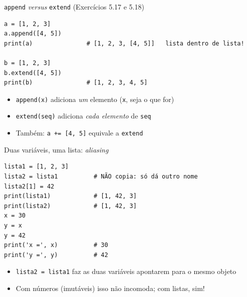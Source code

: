 \documentclass[aspectratio=169,10pt,t]{beamer}
\begin{document}
\begin{frame}[fragile]{\texttt{append} \emph{versus} \texttt{extend} (Exercícios 5.17 e 5.18)}
\begin{lstlisting}
a = [1, 2, 3]
a.append([4, 5])
print(a)               # [1, 2, 3, [4, 5]]   lista dentro de lista!

b = [1, 2, 3]
b.extend([4, 5])
print(b)               # [1, 2, 3, 4, 5]
\end{lstlisting}
  \begin{itemize}
    \item \texttt{append(x)} adiciona \emph{um} elemento (\texttt{x}, seja o que for)
    \item \texttt{extend(seq)} adiciona \emph{cada elemento} de \texttt{seq}
    \item Também: \texttt{a += [4, 5]} equivale a \texttt{extend}
  \end{itemize}
\end{frame}

\begin{frame}[fragile]{Duas variáveis, uma lista: \emph{aliasing}}
\begin{lstlisting}
lista1 = [1, 2, 3]
lista2 = lista1          # NÃO copia: só dá outro nome
lista2[1] = 42
print(lista1)            # [1, 42, 3]
print(lista2)            # [1, 42, 3]
x = 30
y = x
y = 42
print('x =', x)          # 30
print('y =', y)          # 42
\end{lstlisting}
  \begin{itemize}
    \item \texttt{lista2 = lista1} faz as duas variáveis apontarem para \alert{o mesmo objeto}
    \item Com números (imutáveis) isso não incomoda; com listas, sim!
  \end{itemize}
\end{frame}
\end{document}
